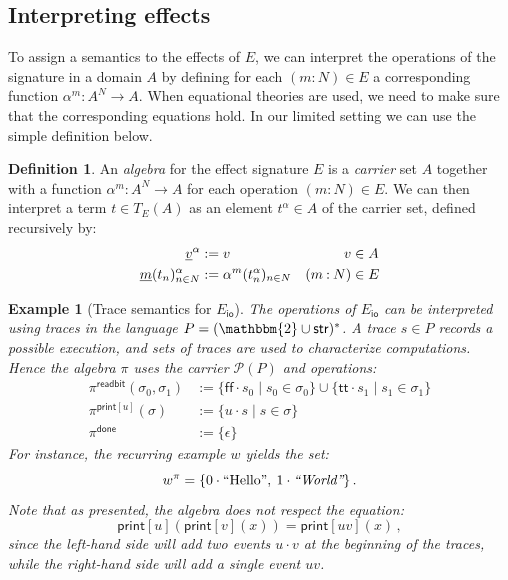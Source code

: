 \documentclass[11pt,oneside]{book}
\newtheorem{example}[theorem]{Example}
\theoremstyle{definition}
\newtheorem{definition}[theorem]{Definition}
\newcommand{\kw}[1]{\ensuremath{ \mathsf{#1} }}
\newcommand{\ul}[1]{%
  \underline{\smash{#1}}
}
\begin{document}

\subsection{Interpreting effects} %

To assign a semantics to the effects of $E$,
we can interpret the operations of the signature
in a domain $A$
by defining for each $(m \mathbin{:} N) \in E$
a corresponding function $\alpha^m : A^N \rightarrow A$.
When equational theories are used,
we need to make sure that the corresponding equations hold.
In our limited setting we can use the simple definition below.

\begin{definition} \label{def:algebra} %
An \emph{algebra}
for the effect signature $E$
is a \emph{carrier} set $A$
together with a function
$\alpha^m : A^N \rightarrow A$
for each operation $(m \mathbin{:} N) \in E$.
We can then interpret
a term $t \in T_E(A)$
as an element $t^\alpha \in A$ of the carrier set,
defined recursively by:
\begin{align*}
  \ul{v}^\alpha &:= v & v &\in A \\
  \ul{m}(t_n)_{n \in N}^\alpha &:=
    \alpha^m(t_n^\alpha)_{n \in N} & (m \mathbin{:} N) &\in E
\end{align*}
\end{definition}

\begin{example}[Trace semantics for $E_\kw{io}$] %
The operations of $E_\kw{io}$ can be interpreted using traces
in the language $P = (\mathbbm{2} \cup \kw{str})^*$.
A trace $s \in P$ records a possible execution,
and sets of traces are used to characterize computations.
Hence the algebra $\pi$ uses the carrier $\mathcal{P}(P)$
and operations:
\begin{align*}
  \pi^\kw{readbit}(\sigma_0, \sigma_1) &:=
    \{ \kw{ff} \cdot s_0 \mid s_0 \in \sigma_0 \} \cup
    \{ \kw{tt} \cdot s_1 \mid s_1 \in \sigma_1 \}
  \\
  \pi^{\kw{print}[u]}(\sigma) &:=
    \{ u \cdot s \mid s \in \sigma \}
  \\
  \pi^{\kw{done}} &:=
    \{ \epsilon \}
\end{align*}
For instance, the recurring example $w$ yields the set:
\[
  w^\pi =
  \{ 0 \cdot \text{\rm ``Hello''}, \: 1 \cdot \text{\em ``World''} \}
  \,.
\]
Note that as presented,
the algebra does not respect the equation:
\[
  \kw{print}[u](\kw{print}[v](x)) = \kw{print}[uv](x)
  \,,
\]
since the left-hand side will add two events $u \cdot v$
at the beginning of the traces,
while the right-hand side will add a single event $uv$.
\end{example}
\end{document}
